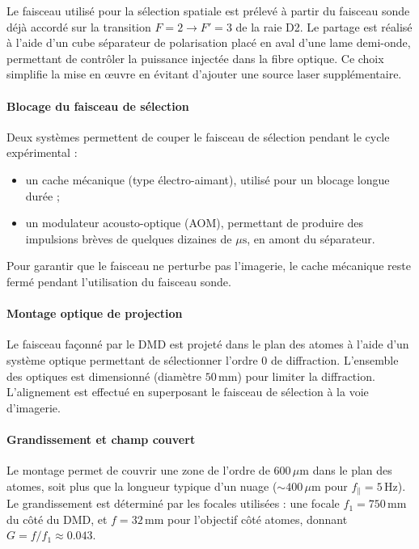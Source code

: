 Le faisceau utilisé pour la sélection spatiale est prélevé à partir du faisceau sonde déjà accordé sur la transition \(F=2 \rightarrow F'=3\) de la raie D2. Le partage est réalisé à l’aide d’un cube séparateur de polarisation placé en aval d’une lame demi-onde, permettant de contrôler la puissance injectée dans la fibre optique. Ce choix simplifie la mise en œuvre en évitant d’ajouter une source laser supplémentaire.

\paragraph{Blocage du faisceau de sélection}

Deux systèmes permettent de couper le faisceau de sélection pendant le cycle expérimental :
\begin{itemize}
    \item un cache mécanique (type électro-aimant), utilisé pour un blocage longue durée ;
    \item un modulateur acousto-optique (AOM), permettant de produire des impulsions brèves de quelques dizaines de \(\mu\mathrm{s}\), en amont du séparateur.
\end{itemize}
Pour garantir que le faisceau ne perturbe pas l’imagerie, le cache mécanique reste fermé pendant l’utilisation du faisceau sonde.

\paragraph{Montage optique de projection}

Le faisceau façonné par le DMD est projeté dans le plan des atomes à l’aide d’un système optique permettant de sélectionner l’ordre 0 de diffraction. L’ensemble des optiques est dimensionné (diamètre \(50\,\mathrm{mm}\)) pour limiter la diffraction. L’alignement est effectué en superposant le faisceau de sélection à la voie d’imagerie.

\paragraph{Grandissement et champ couvert}

Le montage permet de couvrir une zone de l’ordre de \(600\,\mu\mathrm{m}\) dans le plan des atomes, soit plus que la longueur typique d’un nuage (\(\sim 400\,\mu\mathrm{m}\) pour \(f_{\parallel}=5\,\mathrm{Hz}\)). Le grandissement est déterminé par les focales utilisées : une focale \(f_1 = 750\,\mathrm{mm}\) du côté du DMD, et \(f = 32\,\mathrm{mm}\) pour l’objectif côté atomes, donnant \(G = f/f_1 \approx 0.043\).

